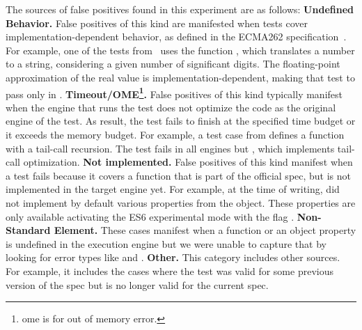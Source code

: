 \documentclass[sigconf,review, anonymous]{acmart}
\begin{document}

\sloppy The sources of false positives found in this experiment are as
follows: \textbf{Undefined Behavior.} False positives of this kind are
manifested when tests cover implementation-dependent behavior, as
defined in the ECMA262 specification~\cite{ecmas262-spec}. For
example, one of the tests from \jerry\ uses the function
, which translates a number to
a string, considering a given number of significant digits. The
floating-point approximation of the real value is
implementation-dependent, making that test to pass only in
\chakra. \textbf{Timeout/OME\footnote{ome is for out of memory
    error.}.} False positives of this kind typically manifest when the
engine that runs the test does not optimize the code as the original
engine of the test. As result, the test fails to finish at the
specified time budget or it exceeds the memory budget. For example, a
test case from \jsc{} defines a function with a tail-call
recursion. The test fails in all engines but \jsc{}, which implements
tail-call optimization. \textbf{Not implemented.} False positives of
this kind manifest when a test fails because it covers a function that
is part of the official spec, but is not implemented in the target
engine yet. For example, at the time of writing, \chakra{} did not
implement by default various properties from the 
object. These properties are only available activating the ES6
experimental mode with the flag .
\textbf{Non-Standard Element.} These cases manifest when a function or
an object property is undefined in the execution engine but we were
unable to capture that by looking for error types like
 and .
\textbf{Other.} This category includes other sources. For example, it
includes the cases where the test was valid for some previous version
of the spec but is no longer valid for the current spec.
\end{document}
